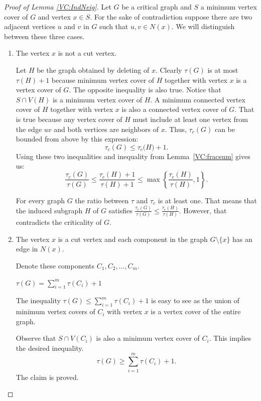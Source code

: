 \begin{proof}[Proof of Lemma \ref{VC:IndNeig}]
Let \(G\) be a critical graph and \(S\) a minimum vertex cover of \(G\) and vertex \(x \in S\).
For the sake of contradiction suppose there are two adjacent vertices \(u\) and \(v\) in \(G\) such that \(u, v \in N(x)\).
We will distinguish between these three cases.
\begin{enumerate}
\item The vertex \(x\) is not a cut vertex.
	
	Let \(H\) be the graph obtained by deleting of \(x\).
	Clearly \(\tau(G)\) is at most \(\tau(H) + 1\) because minimum vertex cover of \(H\) together with vertex \(x\) is a vertex cover of \(G\).
	The opposite inequality is also true. Notice that \(S \cap V(H)\) is a minimum vertex cover of \(H\). 
	A minimum connected vertex cover of \(H\) together with vertex \(x\) is also a connected vertex cover of \(G\).
	That is true because any vertex cover of \(H\) must include at least one vertex from the edge \(uv\) and both vertices are neighbors of \(x\). 
	Thus, \(\tau_c(G)\) can be bounded from above by this expression:
        	\[\tau_c(G) \leq {\tau_c(H}) + 1.\]
	Using these two inequalities and inequality from Lemma~\ref{VC:fracsum} gives us:	
		\[{\frac{\tau_c(G)}{\tau(G)}} \leq {\frac{\tau_c(H) + 1}{\tau(H) + 1}} \leq {\max\left\{ \frac{\tau_c(H)}{\tau(H)}, 1\right\}}.\]
	
	For every graph \(G\) the ratio between \(\tau\) and \(\tau_c\) is at least one.
	That means that the induced subgraph \(H\) of \(G\) satisfies \(\frac{\tau_c(G)}{\tau(G)} \leq {\frac {\tau_c(H)}{\tau(H)}}\).
	However, that contradicts the criticality of \(G\).
	
\item The vertex \(x\) is a cut vertex and each component in the graph \(G \setminus \{x\}\) has an edge in \(N(x)\).
	
	Denote these components \(C_1, C_2, \dots, C_m\).
	\begin{claim}
		\(\tau(G) = {\sum_{i = 1}^{m}{\tau(C_i)} + 1}\)
	\end{claim}
	The inequality \(\tau(G) \leq {\sum_{i = 1}^{m}{\tau(C_i)} + 1}\) is easy to see as the union of minimum vertex covers of \(C_i\) with vertex \(x\) is a vertex cover of the entire graph.
	
	Observe that \(S \cap V(C_i)\) is also a minimum vertex cover of \(C_i\). This implies the desired inequality.
		\[\tau(G) \geq {\sum_{i=1}^{m}{\tau(C_i)} + 1}.\]
	The claim is proved.
	

\end{enumerate}
\end{proof}
